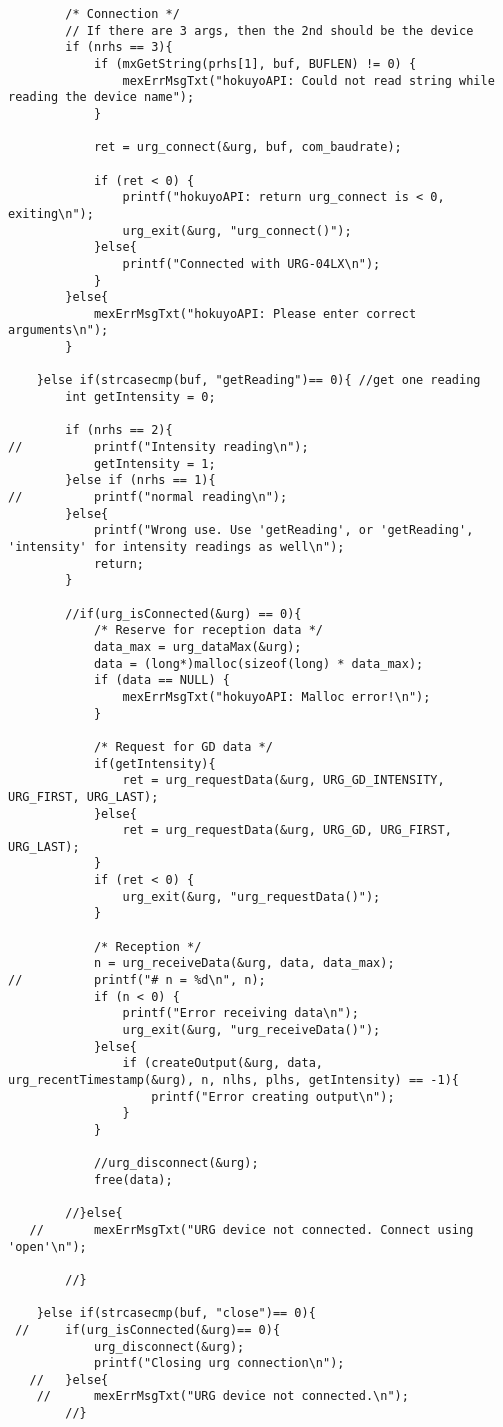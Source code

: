 \begin{lstlisting}
        /* Connection */
        // If there are 3 args, then the 2nd should be the device 
        if (nrhs == 3){
        	if (mxGetString(prhs[1], buf, BUFLEN) != 0) {
        		mexErrMsgTxt("hokuyoAPI: Could not read string while reading the device name");
        	}

        	ret = urg_connect(&urg, buf, com_baudrate);

        	if (ret < 0) {
        		printf("hokuyoAPI: return urg_connect is < 0, exiting\n");
        		urg_exit(&urg, "urg_connect()");
        	}else{
        		printf("Connected with URG-04LX\n");
        	}
        }else{
        	mexErrMsgTxt("hokuyoAPI: Please enter correct arguments\n");
        }

    }else if(strcasecmp(buf, "getReading")== 0){ //get one reading
    	int getIntensity = 0;

    	if (nrhs == 2){
//    		printf("Intensity reading\n");
    		getIntensity = 1;
    	}else if (nrhs == 1){
//    		printf("normal reading\n");
    	}else{
    		printf("Wrong use. Use 'getReading', or 'getReading', 'intensity' for intensity readings as well\n");
    		return;
    	}

    	//if(urg_isConnected(&urg) == 0){
    		/* Reserve for reception data */
    		data_max = urg_dataMax(&urg);
    		data = (long*)malloc(sizeof(long) * data_max);
    		if (data == NULL) {
    			mexErrMsgTxt("hokuyoAPI: Malloc error!\n");
    		}

    		/* Request for GD data */
    		if(getIntensity){
    			ret = urg_requestData(&urg, URG_GD_INTENSITY, URG_FIRST, URG_LAST);
    		}else{
    			ret = urg_requestData(&urg, URG_GD, URG_FIRST, URG_LAST);
    		}
    		if (ret < 0) {
    			urg_exit(&urg, "urg_requestData()");
    		}

    		/* Reception */
    		n = urg_receiveData(&urg, data, data_max);
//    		printf("# n = %d\n", n);
    		if (n < 0) {
    			printf("Error receiving data\n");
    			urg_exit(&urg, "urg_receiveData()");
    		}else{
    			if (createOutput(&urg, data, urg_recentTimestamp(&urg), n, nlhs, plhs, getIntensity) == -1){
    				printf("Error creating output\n");
    			}
    		}

    		//urg_disconnect(&urg);
    		free(data);

    	//}else{
   // 		mexErrMsgTxt("URG device not connected. Connect using 'open'\n");

    	//}

    }else if(strcasecmp(buf, "close")== 0){
 //   	if(urg_isConnected(&urg)== 0){
    		urg_disconnect(&urg);
    		printf("Closing urg connection\n");
   // 	}else{
    //		mexErrMsgTxt("URG device not connected.\n");
    	//}


\end{lstlisting}
